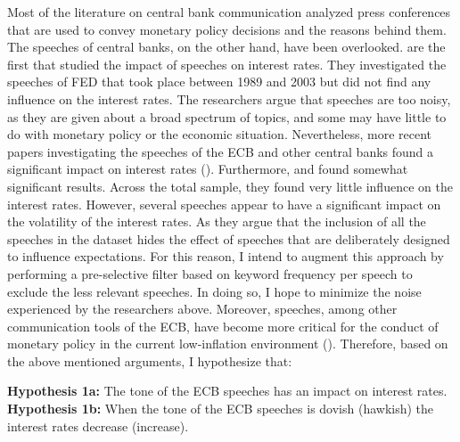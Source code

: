 Most of the literature on central bank communication analyzed press conferences that are used to convey monetary policy decisions and the reasons behind them. The speeches of central banks, on the other hand, have been overlooked. \textcite{kohn2003} are the first that studied the impact of speeches on interest rates. They investigated the speeches of FED that took place between 1989 and 2003 but did not find any influence on the interest rates. The researchers argue that speeches are too noisy, as they are given about a broad spectrum of topics, and some may have little to do with monetary policy or the economic situation. Nevertheless, more recent papers investigating the speeches of the ECB and other central banks found a significant impact on interest rates (\cite{andersson2006,rozkrut2007,ehrmann2007}). Furthermore, \textcite{reeves2007} and \textcite{connolly2004} found somewhat significant results. Across the total sample, they found very little influence on the interest rates. However, several speeches appear to have a significant impact on the volatility of the interest rates. As \textcite{kohn2003} they argue that the inclusion of all the speeches in the dataset hides the effect of speeches that are deliberately designed to influence expectations. For this reason, I intend to augment this approach by performing a pre-selective filter based on keyword frequency per speech to exclude the less relevant speeches. In doing so, I hope to minimize the noise experienced by the researchers above. Moreover, speeches, among other communication tools of the ECB, have become more critical for the conduct of monetary policy in the current low-inflation environment (\cite{bernoth2020}). Therefore, based on the above mentioned arguments, I hypothesize that:

\textbf{Hypothesis 1a:} The tone of the ECB speeches has an impact on interest rates.\\
\textbf{Hypothesis 1b:} When the tone of the ECB speeches is dovish (hawkish) the interest rates decrease (increase).


